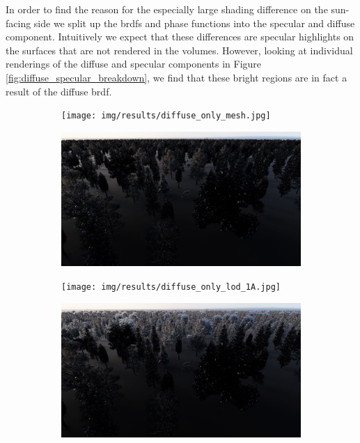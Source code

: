In order to find the reason for the especially large shading difference on the sun-facing side we split up the \acsp{brdf} and phase functions into the specular and diffuse component.
Intuitively we expect that these differences are specular highlights on the surfaces that are not rendered in the volumes.
However, looking at individual renderings of the diffuse and specular components in Figure \ref{fig:diffuse_specular_breakdown}, we find that these bright regions are in fact a result of the diffuse \ac{brdf}.
\begin{figure}[ht]
    \centering
    \begin{subfigure}[b]{0.49\linewidth}
        \centering
        \texttt{[image: img/results/diffuse\_only\_mesh.jpg]}
        \caption{}
    \end{subfigure}
    \begin{subfigure}[b]{0.49\linewidth}
        \centering
        \includegraphics[width=1\linewidth]{img/results/specular_only_mesh.jpg}
        \caption{}
    \end{subfigure}
    \begin{subfigure}[b]{0.49\linewidth}
        \centering
        \texttt{[image: img/results/diffuse\_only\_lod\_1A.jpg]}
        \caption{}
    \end{subfigure}
    \begin{subfigure}[b]{0.49\linewidth}
        \centering
        \includegraphics[width=1\linewidth]{img/results/specular_only_lod_1A.jpg}

\end{subfigure}
\end{figure}
